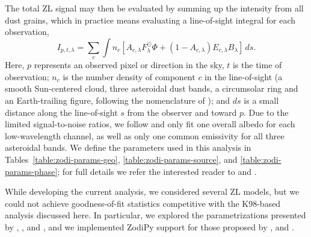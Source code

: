 \documentclass[twocolumn]{aa}
\begin{document}
The total ZL signal may then be evaluated by summing up the intensity
from all dust grains, which in practice means evaluating a line-of-sight 
integral for each observation,
\begin{equation}\label{eq:los}
    I_{p,t, \lambda} = \sum_c \int n_c \left[  A_{c, \lambda} F_\lambda^\odot \Phi + \left( 1 - A_{c, \lambda} \right) E_{c,\lambda} B_\lambda \right]\,ds.
\end{equation}
Here, $p$ represents an observed pixel or direction in the sky, $t$ is
the time of observation; $n_c$ is the number density of component $c$
in the line-of-sight (a smooth Sun-centered cloud, three asteroidal dust bands, a 
circumsolar ring and an Earth-trailing figure, following the nomenclature of \citealt{kelsall1998}); 
and $ds$ is a small distance along the
line-of-sight $s$ from the observer and toward $p$. Due to the limited signal-to-noise ratios, we follow
\citet{kelsall1998} and only fit one overall albedo for each
low-wavelength channel, as well as only one common emissivity for all
three asteroidal bands. We define the parameters used in this 
analysis in Tables~\ref{table:zodi-params-geo}, \ref{table:zodi-params-source}, and 
\ref{table:zodi-params-phase}; 
for full details we refer the interested reader to
\citet{kelsall1998} and \citet{Hong}.

While developing the current analysis, we considered several ZL 
models, but we could not achieve goodness-of-fit statistics 
competitive with the K98-based analysis discussed here.
In particular, we explored the parametrizations presented by \citet{wright:1998}, 
\citet{Robinson2013}, and \citet{Odegard2019}, and we implemented ZodiPy support for those 
proposed by \citet{Robinson2013}, and \citet{Odegard2019}.

\end{document}
